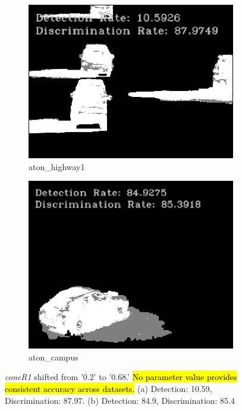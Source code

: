 \begin{figure}
  \centering
  \begin{subfigure}{.49\linewidth}
    \includegraphics[width=1\linewidth]{figures/background/phys_highway1_680.png}
    \caption{aton\_highway1}
  \end{subfigure}
  \hfill
  \begin{subfigure}{.45\linewidth}
    \includegraphics[width=1\linewidth]{figures/background/phys_campus_680.png}
    \caption{aton\_campus}
  \end{subfigure}
  \caption{\textit{coneR1} shifted from '0.2' to '0.68.' \hl{No parameter value provides consistent accuracy across datasets.} (a) Detection: 10.59, Discrimination: 87.97. (b) Detection: 84.9, Discrimination: 85.4}
  \label{fig:coner168}
\end{figure}

